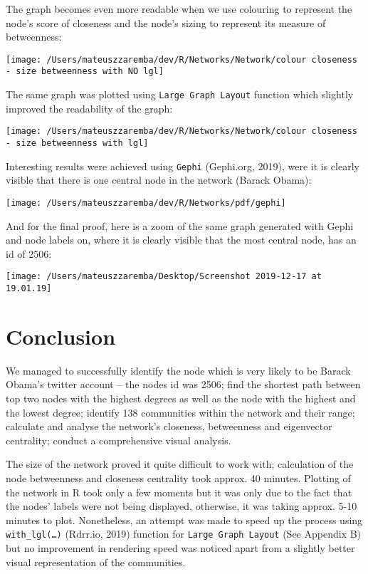 \documentclass[
]{article}
\begin{document}
The graph becomes even more readable when we use colouring to represent
the node's score of closeness and the node's sizing to represent its
measure of betweenness:

\begin{center}\texttt{[image: /Users/mateuszzaremba/dev/R/Networks/Network/colour closeness - size betweenness with NO lgl]} \end{center}

The same graph was plotted using \texttt{Large\ Graph\ Layout} function
which slightly improved the readability of the graph:

\begin{center}\texttt{[image: /Users/mateuszzaremba/dev/R/Networks/Network/colour closeness - size betweenness with lgl]} \end{center}

Interesting results were achieved using \texttt{Gephi} (Gephi.org,
2019), were it is clearly visible that there is one central node in the
network (Barack Obama):

\begin{center}\texttt{[image: /Users/mateuszzaremba/dev/R/Networks/pdf/gephi]} \end{center}

And for the final proof, here is a zoom of the same graph generated with
Gephi and node labels on, where it is clearly visible that the most
central node, has an id of 2506:

\begin{center}\texttt{[image: /Users/mateuszzaremba/Desktop/Screenshot 2019-12-17 at 19.01.19]} \end{center}

\hypertarget{conclusion}{%
\section{Conclusion}\label{conclusion}}

We managed to successfully identify the node which is very likely to be
Barack Obama's twitter account -- the nodes id was 2506; find the
shortest path between top two nodes with the highest degrees as well as
the node with the highest and the lowest degree; identify 138
communities within the network and their range; calculate and analyse
the network's closeness, betweenness and eigenvector centrality; conduct
a comprehensive visual analysis.

The size of the network proved it quite difficult to work with;
calculation of the node betweenness and closeness centrality took
approx. 40 minutes. Plotting of the network in R took only a few moments
but it was only due to the fact that the nodes' labels were not being
displayed, otherwise, it was taking approx. 5-10 minutes to plot.
Nonetheless, an attempt was made to speed up the process using
\texttt{with\_lgl(\ldots{})} (Rdrr.io, 2019) function for
\texttt{Large\ Graph\ Layout} (See Appendix B) but no improvement in
rendering speed was noticed apart from a slightly better visual
representation of the communities.
\end{document}

